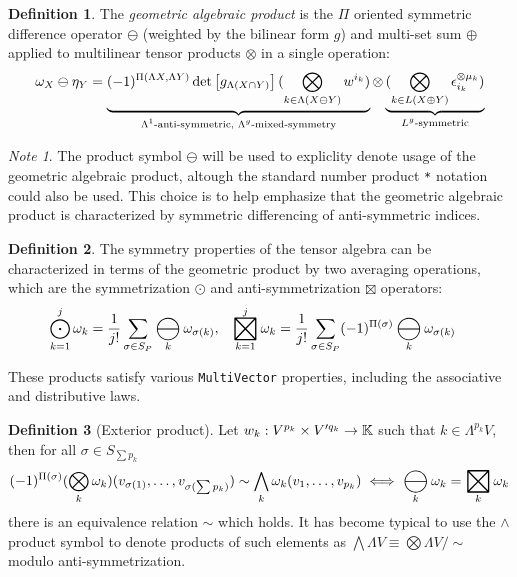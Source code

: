 \documentclass[]{article}
\theoremstyle{definition}
\newtheorem{definition}{Definition}
\theoremstyle{remark}
\newtheorem*{note}{Note}
\DeclareMathOperator*{\bigboxtimes}{\scalerel*{\boxtimes}{\bigodot}}
\DeclareMathOperator*{\bigominus}{\scalerel*{\ominus}{\bigodot}}
\begin{document}
\begin{definition}
	The \textit{geometric algebraic product} is the $\Pi$ oriented symmetric difference operator $\ominus$ (weighted by the bilinear form $g$) and multi-set sum $\oplus$ applied to multilinear tensor products $\otimes$ in a single operation:
	$$ \omega_X\ominus \eta_Y = \ub{\text{$\Lambda^1$-anti-symmetric, $\Lambda^g$-mixed-symmetry}}{(-1)^{\Pi(\Lambda X,\Lambda Y)}\det\mat{g_{\Lambda(X\cap Y)}} (\bigotimes_{k\in \Lambda(X\ominus Y)} w^{i_k})}\otimes \ub{\text{$L^g$-symmetric}}{(\bigotimes_{k\in L(X\oplus Y)} \epsilon_{i_k}^{\otimes\mu_k})}$$
\end{definition}

\begin{note}
	The product symbol $\ominus$ will be used to expliclity denote usage of the geometric algebraic product, altough the standard number product \verb`*` notation could also be used. This choice is to help emphasize that the geometric algebraic product is characterized by symmetric differencing of anti-symmetric indices.
\end{note}

\begin{definition}
	The symmetry properties of the tensor algebra can be characterized in terms of the geometric product by two averaging operations, which are the symmetrization $\odot$ and anti-symmetrization $\boxtimes$ operators:
	\begin{align*}
		\bigodot_{k=1}^j \omega_k &= \frac1{j!}\sum_{\sigma\in S_P}\bigominus_k\omega_{\sigma(k)}, &
		\bigboxtimes_{k=1}^j \omega_k &= \frac1{j!}\sum_{\sigma\in S_P}(-1)^{\Pi(\sigma)}\bigominus_k\omega_{\sigma(k)}
	\end{align*}
\end{definition}
These products satisfy various \verb`MultiVector` properties, including the associative and distributive laws.

\begin{definition}[Exterior product]
	Let $w_k:V^{p_k}\times V'^{q_k}\ra\mb K$ such that $k\in\Lambda^{p_k}V$, then for all $\sigma\in S_{\sum p_k}$
	$$ (-1)^{\Pi(\sigma)}(\bigotimes_k \omega_k)(v_{\sigma(1)},\dots,v_{\sigma(\sum p_k)}) \sim \bigwedge_k \omega_k(v_{1},\dots,v_{p_k}) \iff \bigominus_k\omega_k = \bigboxtimes_k\omega_k $$
	there is an equivalence relation $\sim$ which holds. It has become typical to use the $\wedge$ product symbol to denote products of such elements as $\bigwedge\Lambda V \equiv \bigotimes\Lambda V/\sim$ modulo anti-symmetrization.
\end{definition}
\end{document}
